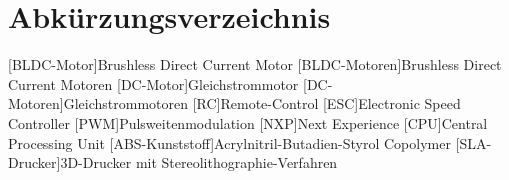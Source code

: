 

\pagestyle {fancy}
\rhead{\thepage} \chead{} 
\cfoot{}

\section*{Abkürzungsverzeichnis}

\begin{acronym}
	[BLDC-Motor]{Brushless Direct Current Motor}
	[BLDC-Motoren]{Brushless Direct Current Motoren}
	[DC-Motor]{Gleich\-strom\-motor}
	[DC-Motoren]{Gleich\-strom\-motoren}
	[RC]{Remote-Control}
	[ESC]{Electronic Speed Controller}
	[PWM]{Puls\-weiten\-modulation}
	[NXP]{Next Experience}
	[CPU]{Central Processing Unit}
	[ABS-Kunststoff]{Acrylnitril-Butadien-Styrol Copolymer}
	[SLA-Drucker]{3D-Drucker mit Stereolithographie-Verfahren}
\end{acronym}

\newpage
